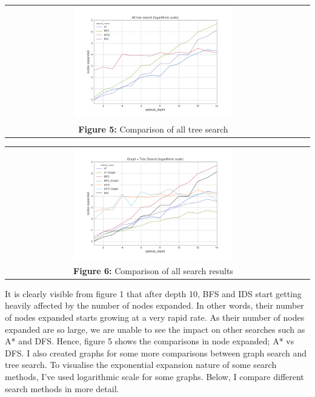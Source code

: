 \documentclass[10pt]{article}
\begin{document}
  \begin{center}
    \begin{tabular}{cc}
    \includegraphics[width=0.55\textwidth]{images/tree_log.png} \\
    \textbf{Figure 5: } Comparison of all tree search \\
      \end{tabular}
    \end{center}

  \begin{center}
    \begin{tabular}{cc}
    \includegraphics[width=0.55\textwidth]{images/all_logged.png} \\
    \textbf{Figure 6: } Comparison of all search results\\
      \end{tabular}
    \end{center}

  \newpage
  It is clearly visible from figure 1 that after depth 10, BFS and IDS start getting heavily affected by the number of nodes expanded. In other words, their number of nodes expanded starts growing at a very rapid rate. As their number of nodes expanded are so large, we are unable to see the impact on other searches such as A* and DFS. Hence, figure 5 shows the comparisons in node expanded; A* vs DFS. I also created graphs for some more comparisons between graph search and tree search. To visualise the exponential expansion nature of some search methods, I’ve used logarithmic scale for some graphs. Below, I compare different search methods in more detail.
\end{document}
